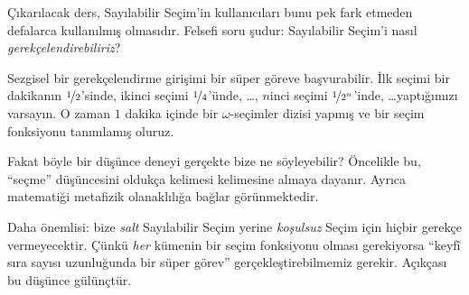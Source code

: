 \documentclass[../../../include/open-logic-section]{subfiles}
\begin{document}
Çıkarılacak ders, Sayılabilir Seçim'in kullanıcıları bunu pek fark etmeden
defalarca kullanılmış olmasıdır. Felsefi soru şudur: Sayılabilir Seçim'i
nasıl \emph{gerekçelendirebiliriz}?

Sezgisel bir gerekçelendirme girişimi bir süper göreve başvurabilir. İlk
seçimi bir dakikanın $\nicefrac{1}{2}$'sinde, ikinci seçimi
$\nicefrac{1}{4}$'ünde, \dots, $n$inci seçimi
$\nicefrac{1}{2^n}$'inde, \dots\@ yaptığımızı varsayın. O zaman $1$ dakika
içinde bir $\omega$-seçimler dizisi yapmış ve bir seçim fonksiyonu
tanımlamış oluruz.

Fakat böyle bir düşünce deneyi gerçekte bize ne söyleyebilir? Öncelikle bu,
``seçme'' düşüncesini oldukça kelimesi kelimesine almaya dayanır. Ayrıca
matematiği metafizik olanaklılığa bağlar görünmektedir.

Daha önemlisi: bize \emph{salt} Sayılabilir Seçim yerine \emph{koşulsuz}
Seçim için hiçbir gerekçe vermeyecektir. Çünkü \emph{her} kümenin bir
seçim fonksiyonu olması gerekiyorsa ``keyfî sıra sayısı uzunluğunda bir
süper görev'' gerçekleştirebilmemiz gerekir. Açıkçası bu düşünce
gülünçtür.
\end{document}
